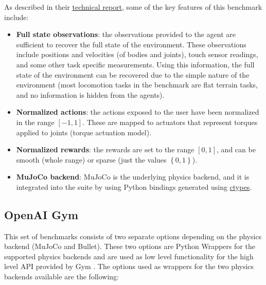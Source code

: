\figBenchmarkControlSuite

As described in their \href{https://arxiv.org/pdf/1801.00690.pdf}{technical report},
some of the key features of this benchmark include:

\begin{itemize}
    \item \textbf{Full state observations}: the observations provided to the agent
          are sufficient to recover the full state of the environment. These observations
          include positions and velocities (of bodies and joints), touch sensor readings,
          and some other task specific measurements. Using this information, the full state
          of the environment can be recovered due to the simple nature of the environment 
          (most locomotion tasks in the benchmark are flat terrain tasks, and no information
          is hidden from the agents).

    \item \textbf{Normalized actions}: the actions exposed to the user have been normalized 
          in the range $\left[-1,1\right]$. These are mapped to actuators that represent
          torques applied to joints (torque actuation model).

    \item \textbf{Normalized rewards}: the rewards are set to the range $\left[ 0, 1 \right]$, 
          and can be smooth (whole range) or sparse (just the values $\left\{0,1\right\}$).

    \item \textbf{MuJoCo backend}: MuJoCo is the underlying physics backend, and it is
          integrated into the suite by using Python bindings generated using 
          \href{https://github.com/deepmind/dm_control/blob/master/dm_control/autowrap/autowrap.py}{ctypes}.
\end{itemize}

\subsection{OpenAI Gym}

This set of benchmarks consists of two separate options depending on the physics 
backend (MuJoCo and Bullet). These two options are Python Wrappers for the supported 
physics backends and are used as low level functionality for the high level API provided by Gym \citep{Gym}.
The options used as wrappers for the two physics backends available are the following:

